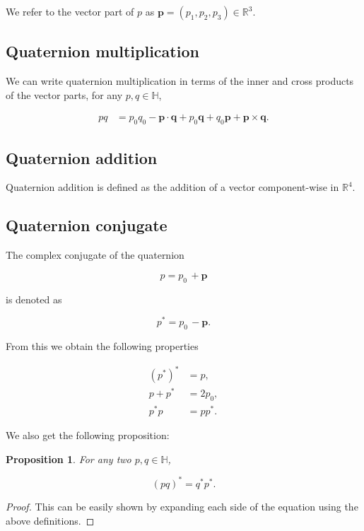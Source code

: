 \documentclass[a4paper, 11pt]{article}
\newtheorem{proposition}{Proposition}
\begin{document}
We refer to the vector part of \(p\) as \(\boldsymbol{p} =(p_1,p_2,p_3) \in \mathbb{R}^3\). \citep[p.~2]{jia_2013_quaternions}



\subsection{Quaternion multiplication}
We can write quaternion multiplication in terms of the inner and cross products of the vector parts, for any \(p,q \in \mathbb{H}\), \citep[p.~2]{jia_2013_quaternions}

\[
\begin{aligned}
pq &= p_0 q_0 - \boldsymbol{p} \cdot \boldsymbol{q}
+ p_0 \boldsymbol{q}
+ q_0 \boldsymbol{p}
+ \boldsymbol{p}  \times \boldsymbol{q}.
\end{aligned}
\]


\subsection{Quaternion addition}

Quaternion addition is defined as the addition of a vector component-wise in $\mathbb{R}^4$. \citep[p.~2]{jia_2013_quaternions}

\subsection{Quaternion conjugate}

The complex conjugate of the quaternion 

\[p = p_0 \,+ \boldsymbol{p}\]

is denoted as

\[p^*= p_0 \,- \boldsymbol{p}.\] \citep[p.~3]{jia_2013_quaternions}

From this we obtain the following properties

\[
\begin{aligned}
(p^*)^* &=  p, \\[6pt]
p + p^* &= 2p_0, \\[6pt]
p^* p &= p p^* .
\end{aligned}
\] \citep[p.~3]{jia_2013_quaternions}

We also get the following proposition:

\begin{proposition}

    For any two $p,q \in \mathbb{H}$,

    \[(pq)^* = q^*p^*.\]
\end{proposition}
\begin{proof}

    This can be easily shown by expanding each side of the equation using the above definitions. 
\end{proof}
\end{document}
